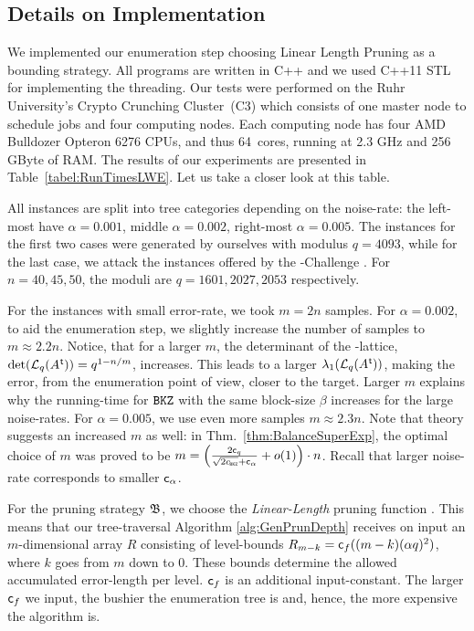 \subsection{Details on Implementation} \label{sec:DetailsOnImplementation}

We implemented our \BDD{} enumeration step choosing Linear Length Pruning as a bounding strategy.
All programs are written in \textsc{C++} and we used \textsc{C++11 STL} for implementing the threading. Our tests were performed on the Ruhr University's
{Crypto Crunching Cluster}~(C3) \cite{C3} which consists of one master node to schedule jobs and four computing
nodes. Each computing node has four AMD Bulldozer Opteron 6276 CPUs, and thus 64~cores,
running at 2.3 GHz and 256 GByte of RAM\@. The results of our experiments are
presented in Table~\ref{tabel:RunTimesLWE}. Let us take a closer look at this table.

All instances are split into tree categories depending on the noise-rate: the left-most have $\alpha=0.001$, middle $\alpha=0.002$, right-most $\alpha=0.005$. The instances for the first two cases were generated by ourselves with modulus $q=4093$, while for the last case, we attack the instances offered by the \LWE-Challenge \cite{LWEChallenge}. For $n=40, 45, 50$, the moduli are $q=1601, 2027, 2053$ respectively.

For the \LWE instances with small error-rate, we took $m=2n$ samples. For $\alpha=0.002$, to aid the enumeration step, we  slightly increase the number of samples to $m \approx 2.2n$. Notice, that for a larger $m$, the determinant of the \LWE-lattice, $\det(\mathcal{L}_q(A\mkern0.7mu^{\mathsf{ t}})) = q^{1-n/m}$, increases. This leads to a larger $\lambda_1(\mathcal{L}_q(A\mkern0.7mu^{\mathsf{ t}}))$, making the error, from the enumeration point of view, closer to the target. Larger $m$ explains why the running-time for $\texttt{BKZ}$ with the same block-size $\beta$ increases for the large noise-rates. For $\alpha=0.005$, we use even more samples $m \approx 2.3n$. Note that theory suggests an increased $m$ as well: in Thm.~\ref{thm:BalanceSuperExp}, the optimal choice of $m$ was proved to be $m=\left( \frac{2 \cq}{\sqrt{2 \cBKZ}+\ca} + \smallo(1) \right) \cdot n$. Recall that larger noise-rate corresponds to smaller $\mathsf{c}_{\alpha}$. 

For the pruning strategy $\mathfrak{B}$, we choose the \emph{Linear-Length} pruning function \cite{EC:GamNguReg10}. This means that our tree-traversal Algorithm \ref{alg:GenPrunDepth} receives on input an $m$-dimensional array $R$ consisting of level-bounds $R_{m-k} = \mathsf{c}_f ((m-k) (\alpha q)^2)$, where $k$ goes from $m$ down to $0$. These bounds determine the allowed accumulated error-length per level. $\mathsf{c}_f$ is an additional input-constant. The larger $\mathsf{c}_f$ we input, the bushier the enumeration tree is and, hence, the more expensive the algorithm is.

